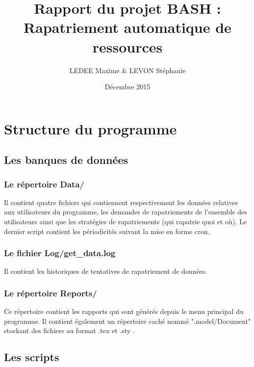 \documentclass[a4paper,11pt]{article}
\title{Rapport du projet BASH : \\ Rapatriement automatique de ressources}
\author{LEDEE Maxime \& LEVON Stéphanie }
\date{Décembre 2015}
\begin{document}
\maketitle

\tableofcontents


\newpage


\section{Structure du programme}
	
	\subsection{Les banques de données}
	
		\subsubsection{Le répertoire Data/}
		Il contient quatre fichiers qui contiennent respectivement les données relatives aux utilisateurs du programme, 
		les demandes de rapatriements de l'ensemble des utilisateurs ainsi que les stratégies de rapatriements (qui rapatrie quoi et où). 
		Le dernier script contient les périodicités suivant la mise en forme cron. \\
	
		\subsubsection{Le fichier Log/get\_data.log}
		Il contient les historiques de tentatives de rapatriement de données.
		
		\subsubsection{Le répertoire Reports/}
		Ce répertoire contient les rapports qui sont générés depuis le menu principal du programme. Il contient également un répertoire caché nommé ".model/Document" stockant des fichiers au format .tex et .sty .	
	
	\subsection{Les scripts}
	
\end{document}
